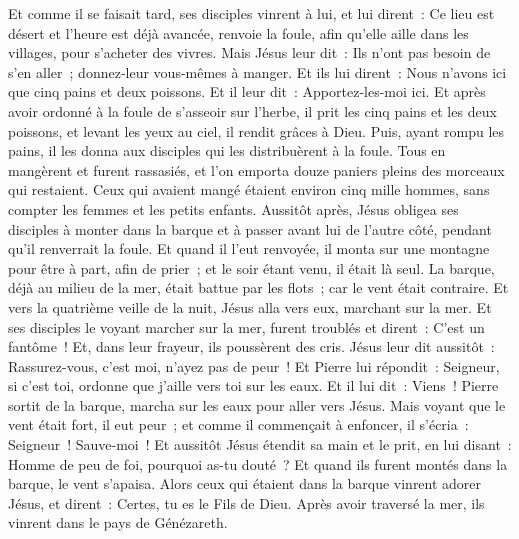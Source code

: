 \begin{multicols}{2}
Et comme il se faisait tard, ses disciples vinrent à lui, et lui dirent~: Ce lieu est désert et l'heure est déjà avancée, renvoie la foule, afin qu'elle aille dans les villages, pour s'acheter des vivres.
Mais Jésus leur dit~: Ils n'ont pas besoin de s'en aller~; donnez-leur vous-mêmes à manger.
Et ils lui dirent~: Nous n'avons ici que cinq pains et deux poissons.
Et il leur dit~: Apportez-les-moi ici.
Et après avoir ordonné à la foule de s'asseoir sur l'herbe, il prit les cinq pains et les deux poissons, et levant les yeux au ciel, il rendit grâces à Dieu. Puis, ayant rompu les pains, il les donna aux disciples qui les distribuèrent à la foule.
Tous en mangèrent et furent rassasiés, et l'on emporta douze paniers pleins des morceaux qui restaient.
Ceux qui avaient mangé étaient environ cinq mille hommes, sans compter les femmes et les petits enfants.
Aussitôt après, Jésus obligea ses disciples à monter dans la barque et à passer avant lui de l'autre côté, pendant qu'il renverrait la foule.
Et quand il l'eut renvoyée, il monta sur une montagne pour être à part, afin de prier~; et le soir étant venu, il était là seul.
La barque, déjà au milieu de la mer, était battue par les flots~; car le vent était contraire.
Et vers la quatrième veille de la nuit, Jésus alla vers eux, marchant sur la mer.
Et ses disciples le voyant marcher sur la mer, furent troublés et dirent~: C'est un fantôme~! Et, dans leur frayeur, ils poussèrent des cris.
Jésus leur dit aussitôt~: Rassurez-vous, c'est moi, n'ayez pas de peur~!
Et Pierre lui répondit~: Seigneur, si c'est toi, ordonne que j'aille vers toi sur les eaux.
Et il lui dit~: Viens~! Pierre sortit de la barque, marcha sur les eaux pour aller vers Jésus.
Mais voyant que le vent était fort, il eut peur~; et comme il commençait à enfoncer, il s'écria~: Seigneur~! Sauve-moi~!
Et aussitôt Jésus étendit sa main et le prit, en lui disant~: Homme de peu de foi, pourquoi as-tu douté~?
Et quand ils furent montés dans la barque, le vent s'apaisa.
Alors ceux qui étaient dans la barque vinrent adorer Jésus, et dirent~: Certes, tu es le Fils de Dieu.
Après avoir traversé la mer, ils vinrent dans le pays de Génézareth.

\end{multicols}
